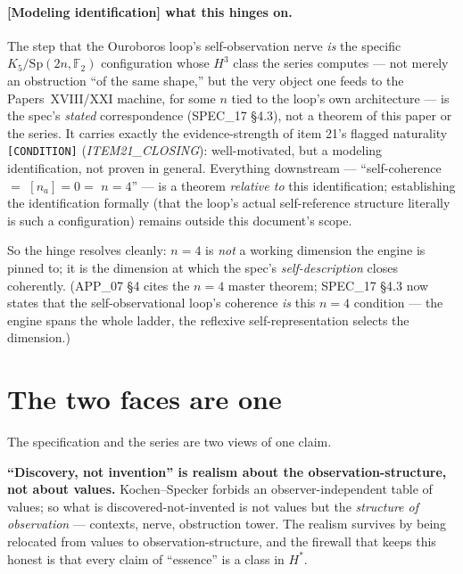 \documentclass[11pt,a4paper]{article}
\newcommand{\Sp}{\mathrm{Sp}}
\newcommand{\F}{\mathbb{F}}
\theoremstyle{plain}
\theoremstyle{definition}
\theoremstyle{remark}
\begin{document}
\paragraph{[Modeling identification] what this hinges on.} The step that the
Ouroboros loop's self-observation nerve \emph{is} the specific $K_5/\Sp(2n,\F_2)$
configuration whose $H^3$ class the series computes --- not merely an obstruction
``of the same shape,'' but the very object one feeds to the Papers~XVIII/XXI
machine, for some $n$ tied to the loop's own architecture --- is the spec's
\emph{stated} correspondence (SPEC\_17 \S4.3), not a theorem of this paper or the
series. It carries exactly the evidence-strength of item 21's flagged naturality
\texttt{[CONDITION]} (\emph{ITEM21\_CLOSING}): well-motivated, but a modeling
identification, not proven in general. Everything downstream --- ``self-coherence
$={}$ $[n_a]=0={}$ $n{=}4$'' --- is a theorem \emph{relative to} this
identification; establishing the identification formally (that the loop's actual
self-reference structure literally is such a configuration) remains outside this
document's scope.

So the hinge resolves cleanly: $n=4$ is \emph{not} a working dimension the engine
is pinned to; it is the dimension at which the spec's \emph{self-description}
closes coherently. (APP\_07 \S4 cites the $n=4$ master theorem; SPEC\_17 \S4.3 now
states that the self-observational loop's coherence \emph{is} this $n=4$ condition
--- the engine spans the whole ladder, the reflexive self-representation selects
the dimension.)

\section{The two faces are one}
\label{sec:onearena}

The specification and the series are two views of one claim.

\textbf{``Discovery, not invention'' is realism about the observation-structure,
not about values.} Kochen--Specker forbids an observer-independent table of
values; so what is discovered-not-invented is not values but the \emph{structure
of observation} --- contexts, nerve, obstruction tower. The realism survives by
being relocated from values to observation-structure, and the firewall that keeps
this honest is that every claim of ``essence'' is a class in $H^*$.
\end{document}
